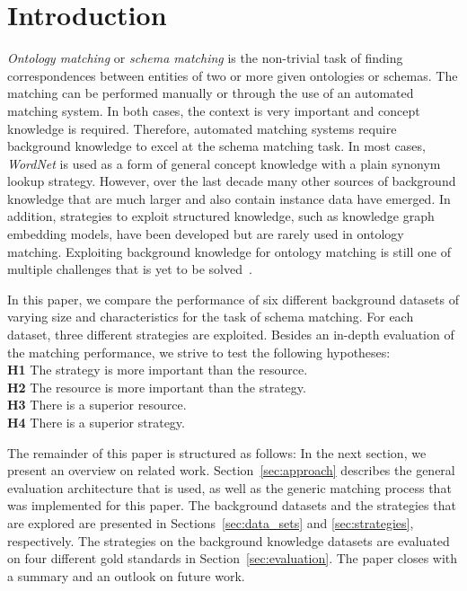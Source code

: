\documentclass[runningheads]{llncs}
\begin{document}
\section{Introduction}
\textit{Ontology matching} or \textit{schema matching} is the non-trivial task of finding correspondences between entities of two or more given ontologies or schemas. 
The matching can be performed manually or through the use of an automated matching system. In both cases, the context is very important and concept knowledge is required. Therefore, automated matching systems require background knowledge to excel at the schema matching task. In most cases, \textit{WordNet} is used as a form of general concept knowledge with a plain synonym lookup strategy. However, over the last decade many other sources of background knowledge that are much larger and also contain instance data have emerged. In addition, strategies to exploit structured knowledge, such as knowledge graph embedding models, have been developed but are rarely used in ontology matching. Exploiting background knowledge for ontology matching is still one of multiple challenges that is yet to be solved~\cite{challenges_2}. 

In this paper, we compare the performance of six different background data\-sets of varying size and characteristics for the task of schema matching. For each dataset, three different strategies are exploited. Besides an in-depth evaluation of the matching performance, we strive to test the 
following hypotheses:\\
\textbf{H1} The strategy is more important than the resource.\\
\textbf{H2} The resource is more important than the strategy.\\
\textbf{H3} There is a superior resource.\\
\textbf{H4} There is a superior strategy.

The remainder of this paper is structured as follows: In the next section, we present an overview on related work. Section~\ref{sec:approach} describes the general evaluation architecture that is used, as well as the generic matching process that was implemented for this paper. The background datasets and the strategies that are explored are presented in Sections~\ref{sec:data_sets} and \ref{sec:strategies}, respectively. The strategies on the background knowledge datasets are evaluated on four different gold standards in Section~\ref{sec:evaluation}. The paper closes with a summary and an outlook on future work. 
\end{document}
